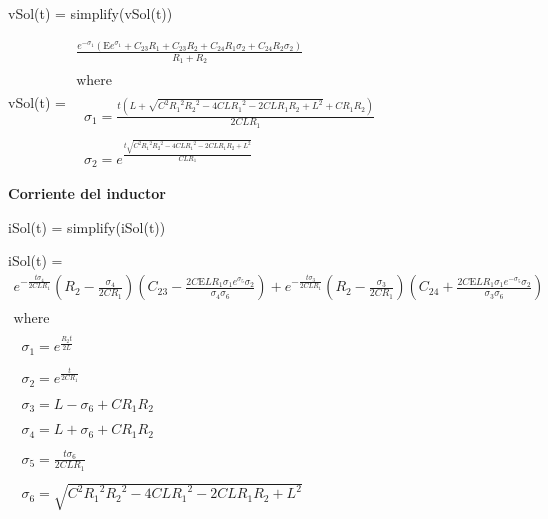 \documentclass[10pt,a4paper]{article} %
\begin{document}
\begin{matlabcode}
	vSol(t) = simplify(vSol(t))
\end{matlabcode}
\begin{matlabsymbolicoutput}
	vSol(t) = 
	$\displaystyle \begin{array}{l}
	\frac{e^{-\sigma_1 }  {\left(\textrm{E} e^{\sigma_1 } +C_{23}  R_1 +C_{23}  R_2 +C_{24}  R_1  \sigma_2 +C_{24}  R_2  \sigma_2 \right)}}{R_1 +R_2 }\\
	\mathrm{}\\
	\textrm{where}\\
	\mathrm{}\\
	\;\;\sigma_1 =\frac{t {\left(L+\sqrt{C^2  {R_1 }^2  {R_2 }^2 -4 C L {R_1 }^2 -2 C L R_1  R_2 +L^2 }+C R_1  R_2 \right)}}{2 C L R_1 }\\
	\mathrm{}\\
	\;\;\sigma_2 =e^{\frac{t \sqrt{C^2  {R_1 }^2  {R_2 }^2 -4 C L {R_1 }^2 -2 C L R_1  R_2 +L^2 }}{C L R_1 }} 
	\end{array}$
\end{matlabsymbolicoutput}

\begin{par}
	\begin{flushleft}
		\textbf{Corriente del inductor}
	\end{flushleft}
\end{par}

\begin{matlabcode}
	iSol(t) = simplify(iSol(t))
\end{matlabcode}
\begin{matlabsymbolicoutput}
	iSol(t) = 
	$\displaystyle \begin{array}{l}
	e^{-\frac{t \sigma_4 }{2 C L R_1 }}  {\left(R_2 -\frac{\sigma_4 }{2 C R_1 }\right)} {\left(C_{23} -\frac{2 C \textrm{E} L R_1  \sigma_1  e^{\sigma_5 }  \sigma_2 }{\sigma_4  \sigma_6 }\right)}+e^{-\frac{t \sigma_3 }{2 C L R_1 }}  {\left(R_2 -\frac{\sigma_3 }{2 C R_1 }\right)} {\left(C_{24} +\frac{2 C \textrm{E} L R_1  \sigma_1  e^{-\sigma_5 }  \sigma_2 }{\sigma_3  \sigma_6 }\right)}\\
	\mathrm{}\\
	\textrm{where}\\
	\mathrm{}\\
	\;\;\sigma_1 =e^{\frac{R_2  t}{2 L}} \\
	\mathrm{}\\
	\;\;\sigma_2 =e^{\frac{t}{2 C R_1 }} \\
	\mathrm{}\\
	\;\;\sigma_3 =L-\sigma_6 +C R_1  R_2 \\
	\mathrm{}\\
	\;\;\sigma_4 =L+\sigma_6 +C R_1  R_2 \\
	\mathrm{}\\
	\;\;\sigma_5 =\frac{t \sigma_6 }{2 C L R_1 }\\
	\mathrm{}\\
	\;\;\sigma_6 =\sqrt{C^2  {R_1 }^2  {R_2 }^2 -4 C L {R_1 }^2 -2 C L R_1  R_2 +L^2 }
	\end{array}$
\end{matlabsymbolicoutput}
\end{document}
